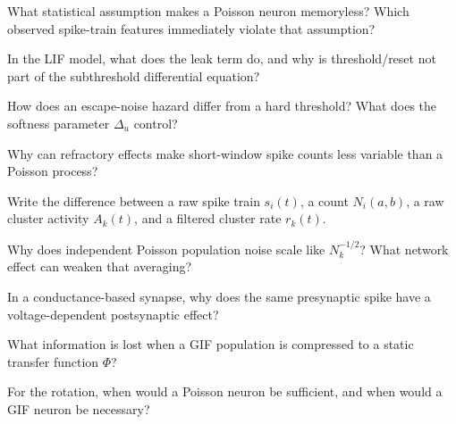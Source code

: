 \begin{conceptquestions}
  \item What statistical assumption makes a Poisson neuron memoryless? Which observed spike-train features immediately violate that assumption?
  \item In the LIF model, what does the leak term do, and why is threshold/reset not part of the subthreshold differential equation?
  \item How does an escape-noise hazard differ from a hard threshold? What does the softness parameter $\Delta_u$ control?
  \item Why can refractory effects make short-window spike counts less variable than a Poisson process?
  \item Write the difference between a raw spike train $s_i(t)$, a count $N_i(a,b)$, a raw cluster activity $A_k(t)$, and a filtered cluster rate $r_k(t)$.
  \item Why does independent Poisson population noise scale like $N_k^{-1/2}$? What network effect can weaken that averaging?
  \item In a conductance-based synapse, why does the same presynaptic spike have a voltage-dependent postsynaptic effect?
  \item What information is lost when a GIF population is compressed to a static transfer function $\Phi$?
  \item For the rotation, when would a Poisson neuron be sufficient, and when would a GIF neuron be necessary?
\end{conceptquestions}

\clearpage
